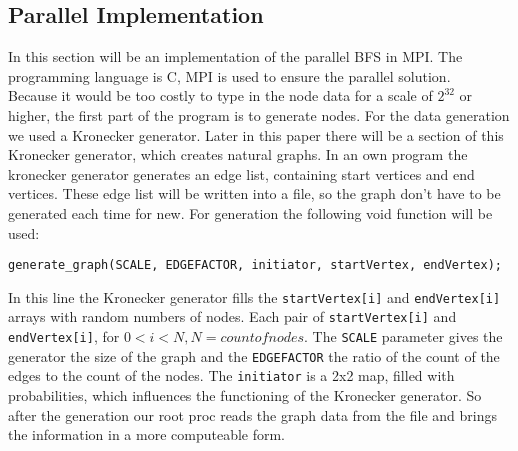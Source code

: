 \documentclass[11pt,a4paper]{article}
\begin{document}
\subsection{Parallel Implementation}
\label{sec:parallel-impl}

In this section will be an implementation of the parallel BFS in MPI. The programming language is C, MPI is used to ensure the parallel solution.\\
Because it would be too costly to type in the node data for a scale of \(2^{32}\) or higher, the first part of the program is to generate nodes. For the data generation we used a Kronecker generator. Later in this paper there will be a section of this Kronecker generator, which creates natural graphs. In an own program the kronecker generator generates an edge list, containing start vertices and end vertices. These edge list will be written into a file, so the graph don't have to be generated each time for new. For generation the following void function will be used:

\begin{lstlisting}
generate_graph(SCALE, EDGEFACTOR, initiator, startVertex, endVertex);
\end{lstlisting}

In this line the Kronecker generator fills the \lstinline{startVertex[i]} and \lstinline{endVertex[i]} arrays with random numbers of nodes. Each pair of \lstinline{startVertex[i]} and \lstinline{endVertex[i]}, for \( 0 < i < N, N = count of nodes \). The \lstinline{SCALE} parameter gives the generator the size of the graph and the \lstinline{EDGEFACTOR} the ratio of the count of the edges to the count of the nodes. The \lstinline{initiator} is a 2x2 map, filled with probabilities, which influences the functioning of the Kronecker generator. So after the generation our root proc reads the graph data from the file and brings the information in a more computeable form.
\end{document}
